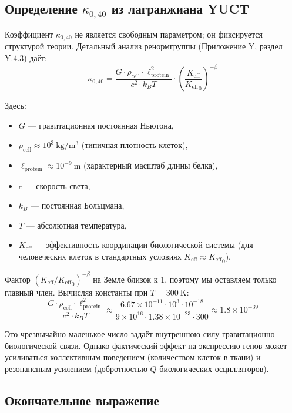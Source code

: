 \documentclass[12pt,a4paper]{article}
\theoremstyle{remark}
\newcommand{\Keff}{K_{\mathrm{eff}}}
\begin{document}
	\subsection{Определение \(\kappa_{0,40}\) из лагранжиана YUCT}
	
	Коэффициент \(\kappa_{0,40}\) не является свободным параметром; он фиксируется структурой теории. Детальный анализ ренормгруппы (Приложение Y, раздел Y.4.3) даёт:
	\begin{equation}
		\kappa_{0,40} = \frac{G \cdot \rho_{\text{cell}} \cdot \ell_{\text{protein}}^2}{c^2 \cdot k_B T} \cdot \left( \frac{\Keff}{{\Keff}_0} \right)^{-\beta}
		\label{eq:kappa-exact}
	\end{equation}
	
	Здесь:
	\begin{itemize}
		\item \(G\) — гравитационная постоянная Ньютона,
		\item \(\rho_{\text{cell}} \approx 10^3\ \mathrm{kg/m^3}\) (типичная плотность клеток),
		\item \(\ell_{\text{protein}} \approx 10^{-9}\ \mathrm{m}\) (характерный масштаб длины белка),
		\item \(c\) — скорость света,
		\item \(k_B\) — постоянная Больцмана,
		\item \(T\) — абсолютная температура,
		\item \(\Keff\) — эффективность координации биологической системы (для человеческих клеток в стандартных условиях \(\Keff \approx {\Keff}_0\)).
	\end{itemize}
	
	Фактор \((\Keff/{\Keff}_0)^{-\beta}\) на Земле близок к 1, поэтому мы оставляем только главный член. Вычисляя константы при \(T = 300\ \mathrm{K}\):
	\[
	\frac{G \cdot \rho_{\text{cell}} \cdot \ell_{\text{protein}}^2}{c^2 \cdot k_B T} \approx \frac{6.67\times 10^{-11} \cdot 10^3 \cdot 10^{-18}}{9\times 10^{16} \cdot 1.38\times 10^{-23} \cdot 300} \approx 1.8 \times 10^{-39}
	\]
	
	Это чрезвычайно маленькое число задаёт внутреннюю силу гравитационно-биологической связи. Однако фактический эффект на экспрессию генов может усиливаться коллективным поведением (количеством клеток в ткани) и резонансным усилением (добротностью \(Q\) биологических осцилляторов).
	
	\subsection{Окончательное выражение}
	
\end{document}
